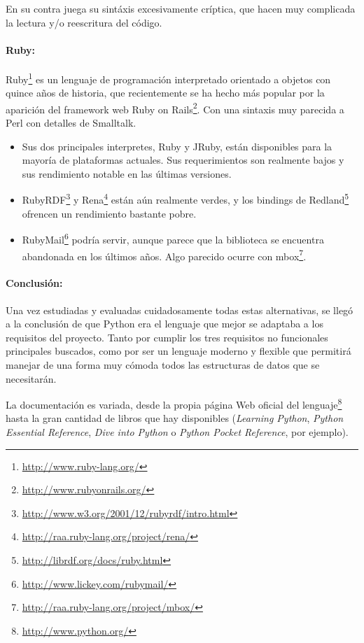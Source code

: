 En su contra juega su sintáxis excesivamente críptica, que hacen muy complicada
la lectura y/o reescritura del código.

\paragraph{Ruby:}Ruby\footnote{\url{http://www.ruby-lang.org/}} es un lenguaje de 
programación interpretado orientado a objetos con quince años de historia, que 
recientemente se ha hecho más popular por la aparición del framework web 
Ruby on Rails\footnote{\url{http://www.rubyonrails.org/}}. Con una sintaxis muy
parecida a Perl con detalles de Smalltalk.

\begin{itemize}
  \item Sus dos principales interpretes, Ruby y JRuby, están disponibles para la
	mayoría de plataformas actuales. Sus requerimientos son realmente bajos y
	sus rendimiento notable en las últimas versiones.
  \item RubyRDF\footnote{\url{http://www.w3.org/2001/12/rubyrdf/intro.html}} y 
	Rena\footnote{\url{http://raa.ruby-lang.org/project/rena/}} están aún
	realmente verdes, y los bindings de Redland\footnote{\url{http://librdf.org/docs/ruby.html}} 
	ofrencen un rendimiento bastante pobre.
  \item RubyMail\footnote{\url{http://www.lickey.com/rubymail/}} podría servir,
	aunque parece que la biblioteca se encuentra abandonada en los últimos años. 
	Algo parecido ocurre con mbox\footnote{\url{http://raa.ruby-lang.org/project/mbox/}}.
\end{itemize}

\paragraph{Conclusión:}Una vez estudiadas y evaluadas cuidadosamente todas estas 
alternativas, se llegó a la conclusión de que Python era el lenguaje que mejor se 
adaptaba a los requisitos del proyecto. Tanto por cumplir los tres requisitos 
no funcionales principales buscados, como por ser un lenguaje moderno y flexible 
que permitirá manejar de una forma muy cómoda todos las estructuras de datos que se
necesitarán.

La documentación es variada, desde la propia página Web oficial del 
lenguaje\footnote{\url{http://www.python.org/}} hasta la gran cantidad de libros
que hay disponibles (\emph{Learning Python}\cite{LearningPython},
\emph{Python Essential Reference}\cite{PythonEssential}, 
\emph{Dive into Python}\cite{DivePython} o \emph{Python Pocket Reference}\cite{PythonPocket},
por ejemplo).
